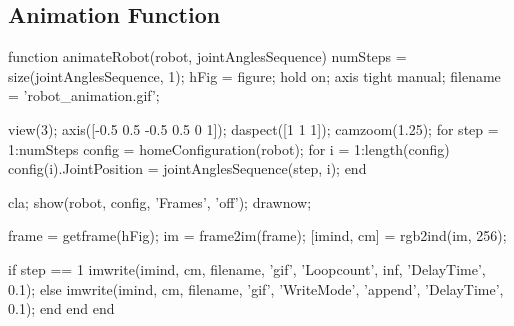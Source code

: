 \documentclass[conference]{IEEEtran}
\begin{document}
\subsection{Animation Function}
\label{appendix:Animate}
\begin{matlabcode}[label={AnimateAppendix}]
function animateRobot(robot, jointAnglesSequence)
    numSteps = size(jointAnglesSequence, 1);
    hFig = figure;
    hold on;
    axis tight manual; %
    filename = 'robot_animation.gif'; %

    view(3); %
    axis([-0.5 0.5 -0.5 0.5 0 1]); %
    daspect([1 1 1]); %
    camzoom(1.25); %
    for step = 1:numSteps
        config = homeConfiguration(robot);
        for i = 1:length(config)
            config(i).JointPosition = jointAnglesSequence(step, i);
        end
        
        cla;
        show(robot, config, 'Frames', 'off');
        drawnow;
   
        
      
        
        frame = getframe(hFig);
        im = frame2im(frame);
        [imind, cm] = rgb2ind(im, 256);
        
        if step == 1
            imwrite(imind, cm, filename, 'gif', 'Loopcount', inf, 'DelayTime', 0.1);
        else
            imwrite(imind, cm, filename, 'gif', 'WriteMode', 'append', 'DelayTime', 0.1);
        end
    end
end
\end{matlabcode}
\end{document}
